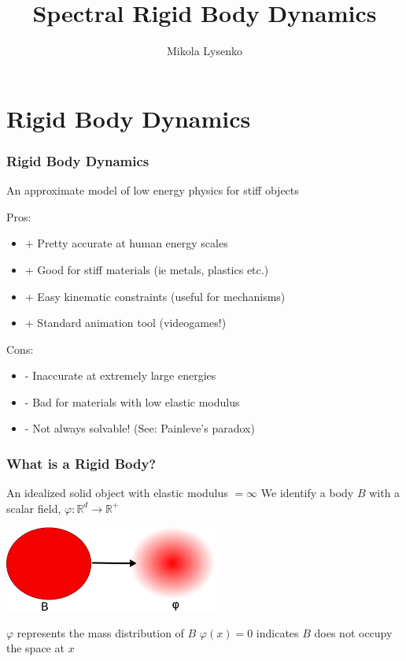 \documentclass{beamer}
\title{Spectral Rigid Body Dynamics}
\author{Mikola Lysenko}
\begin{document}
\newcommand{\R}{\mathbb{R}}

\maketitle

\section{Rigid Body Dynamics}

\begin{frame}
\frametitle{Rigid Body Dynamics}
An approximate model of low energy physics for stiff objects

\pause
\vskip15pt
Pros:
\begin{itemize}
	\item{+} Pretty accurate at human energy scales
	\item{+} Good for stiff materials (ie metals, plastics etc.)
	\item{+} Easy kinematic constraints (useful for mechanisms)
	\item{+} Standard animation tool (videogames!)
\end{itemize}

\pause
\vskip15pt
Cons:
\begin{itemize}
	\item{-} Inaccurate at extremely large energies
	\item{-} Bad for materials with low elastic modulus
	\item{-} Not always solvable! (See: Painleve's paradox)
\end{itemize}
\end{frame}

\begin{frame}
\frametitle{What is a Rigid Body?}
An idealized solid object with elastic modulus $= \infty$
\pause
\vskip5pt
We identify a body $B$ with a scalar field, $\varphi : \R^d \to \R^+$
\vskip5pt
\begin{center}
\includegraphics[height=1.1in]{figures/massfield.png}
\end{center}
\vskip5pt
$\varphi$ represents the mass distribution of $B$
\vskip5pt
$\varphi(x) = 0$ indicates $B$ does not occupy the space at $x$
\end{frame}
\end{document}
